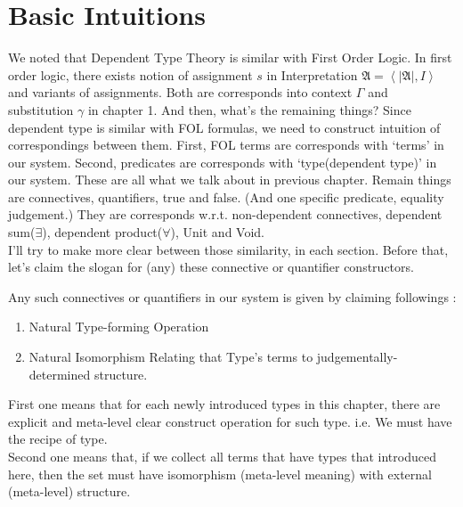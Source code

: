 \documentclass[12pt, a4paper, openany, twoside]{book}
\theoremstyle{definition}
\theoremstyle{remark}
\theoremstyle{plain}
\numberwithin{equation}{section}
\begin{document}
\section{Basic Intuitions}\hypertarget{intuition-2.1.}{}

We noted that Dependent Type Theory is similar with First Order Logic. In first order logic, 
there exists notion of assignment $s$ in Interpretation $\mathfrak{A} = \left<|\mathfrak{A}|, I\right>$ and 
variants of assignments. Both are corresponds into context $\Gamma$ and substitution $\gamma$ in chapter 1. 
And then, what's the remaining things? Since dependent type is similar with FOL formulas, 
we need to construct intuition of correspondings between them. First, FOL terms are corresponds with \lq terms' in our system. 
Second, predicates are corresponds with \lq type(dependent type)' in our system. These are all what we talk about in previous chapter. 
Remain things are connectives, quantifiers, true and false. (And one specific predicate, equality judgement.) 
They are corresponds w.r.t. non-dependent connectives, dependent sum($\exists$), dependent product($\forall$), Unit and Void. 
\\

I'll try to make more clear between those similarity, in each section. Before that, let's claim the slogan for (any) these 
connective or quantifier constructors. 

\begin{tcolorbox}[colback=yellow!10!white,colframe=red!75!black,title=Slogan]\hypertarget{slogan}{}

Any such connectives or quantifiers in our system is given by claiming followings : 

\begin{enumerate}
    \item Natural Type-forming Operation
    \item Natural Isomorphism Relating that Type's terms to judgementally-determined structure. 
\end{enumerate}

\end{tcolorbox}

First one means that for each newly introduced types in this chapter, there are 
explicit and meta-level clear construct operation for such type. i.e. We must have the recipe of type. \\
Second one means that, if we collect all terms that have types that introduced here, then the set must have 
isomorphism (meta-level meaning) with external (meta-level) structure. 
\end{document}
